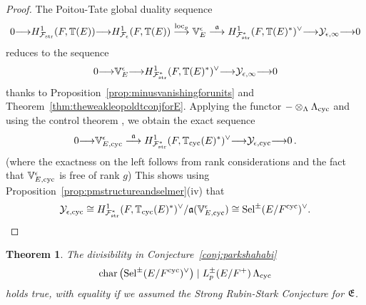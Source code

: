 \documentclass[12pt]{amsart}
\numberwithin{equation}{section}
\newtheorem{thm}{Theorem}[section]
\begin{document}
\begin{proof}

The Poitou-Tate global duality sequence
 $$0{\longrightarrow} H^1_{{\mathcal{F}}_{\textup{str}}}(F,{\mathbb{T}}(E)){\longrightarrow} H^1_{{\mathcal{F}}_\epsilon}(F,{\mathbb{T}}(E))\stackrel{\textup{loc}_p}{\longrightarrow} \mathbb{V}_E^{\epsilon}\stackrel{\frak{a}}{\longrightarrow} H^1_{{\mathcal{F}}_{\textup{str}}^*}(F,{\mathbb{T}}(E)^*)^\vee{\longrightarrow} \mathcal{Y}_{\epsilon,\infty}{\longrightarrow} 0$$
 reduces to the sequence
 $$0{\longrightarrow} \mathbb{V}_E^{\epsilon}{\longrightarrow} H^1_{{\mathcal{F}}_{\textup{str}}^*}(F,{\mathbb{T}}(E)^*)^\vee{\longrightarrow} \mathcal{Y}_{\epsilon,\infty}{\longrightarrow} 0$$
 thanks to Proposition~\ref{prop:minusvanishingforunits} and Theorem~\ref{thm:theweakleopoldtconjforE}. Applying the functor $-\otimes_{\Lambda} {\Lambda}_{\textup{cyc}}$ and using the control theorem \cite[Lemma 3.5.3]{mr02}, we obtain the exact sequence
 \begin{equation}\label{eqn:resolutionofY}0{\longrightarrow} \mathbb{V}_{E,{\textup{cyc}}}^{\epsilon}\stackrel{\frak{a}}{\longrightarrow} H^1_{{\mathcal{F}}_{\textup{str}}^*}(F,{\mathbb{T}}_{\textup{cyc}}(E)^*)^\vee{\longrightarrow} \mathcal{Y}_{\epsilon,{\textup{cyc}}}{\longrightarrow} 0\,.\end{equation}
 (where the exactness on the left follows from rank considerations and the fact that $\mathbb{V}_{E,{\textup{cyc}}}^{\epsilon}$ is free of rank $g$) This shows using Proposition~\ref{prop:pmstructureandselmer}(iv) that
$$\mathcal{Y}_{\epsilon,{\textup{cyc}}}\cong  H^1_{{\mathcal{F}}_{\textup{str}}^*}(F,{\mathbb{T}}_{\textup{cyc}}(E)^*)^\vee/\frak{a}(\mathbb{V}_{E,{\textup{cyc}}}^{\epsilon})\cong\textup{Sel}^{\pm}(E/F^{\textup{cyc}})^\vee.$$
 \end{proof}
\begin{thm}
\label{thm:improvedmainconj} The divisibility in Conjecture~\ref{conj:parkshahabi} 
$$\textup{char}\left(\textup{Sel}^\pm(E/F^{\textup{cyc}})^\vee\right)\mid L_p^\pm(E/F^+)\,{\Lambda}_{\textup{cyc}}$$
holds true, with equality if we assumed the Strong Rubin-Stark Conjecture for $\frak{E}$.
\end{thm}
\end{document}
